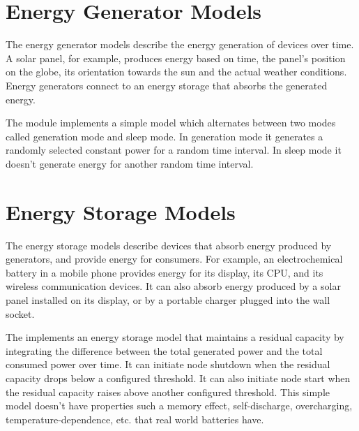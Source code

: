\section{Energy Generator Models}

The energy generator models describe the energy generation of devices over time.
A solar panel, for example, produces energy based on time, the panel's position
on the globe, its orientation towards the sun and the actual weather conditions.
Energy generators connect to an energy storage that absorbs the generated energy. 

The  module implements a simple model which
alternates between two modes called generation mode and sleep mode. In generation
mode it generates a randomly selected constant power for a random time interval.
In sleep mode it doesn't generate energy for another random time interval.
 
\section{Energy Storage Models}

The energy storage models describe devices that absorb energy produced by
generators, and provide energy for consumers. For example, an electrochemical
battery in a mobile phone provides energy for its display, its CPU, and its
wireless communication devices. It can also absorb energy produced by a solar
panel installed on its display, or by a portable charger plugged into the wall
socket.

The  implements an energy storage model that
maintains a residual capacity by integrating the difference between the total
generated power and the total consumed power over time. It can initiate node
shutdown when the residual capacity drops below a configured threshold. It can
also initiate node start when the residual capacity raises above another
configured threshold. This simple model doesn't have properties such a memory
effect, self-discharge, overcharging, temperature-dependence, etc. that real
world batteries have.


